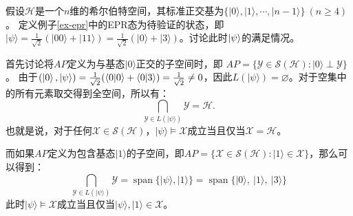 \begin{example}
    假设$\mathcal{H}$是一个$n$维的希尔伯特空间，其标准正交基为$\{|0\rangle, |1\rangle, \cdots, |n - 1\rangle\}\ (n \geq 4)$。
    定义例子\ref{ex-epr}中的EPR态为待验证的状态，即$|\psi\rangle = \frac{1}{\sqrt{2}}(|00\rangle + |11\rangle)= \frac{1}{\sqrt{2}}(|0\rangle + |3\rangle)$。讨论此时\(\ket{\psi}\)的满足情况。
    
    首先讨论将$AP$定义为与基态$|0\rangle$正交的子空间时，即
    $AP = \{\mathcal{Y} \in \mathcal{S}(\mathcal{H}) : |0\rangle \perp \mathcal{Y}\}$。
    由于$(\ket{0},\ket{\psi}) = \frac{1}{\sqrt{2}}(\langle 0|0\rangle + \langle 0|3\rangle) = \frac{1}{\sqrt{2}} \neq 0$，因此$L(|\psi\rangle) = \varnothing$。对于空集中的所有元素取交得到全空间，所以有：
    \begin{equation}
    {\bigcap_{\mathcal{Y} \in L(|\psi\rangle)} \mathcal{Y} = \mathcal{H}.}
    \end{equation}
    也就是说，对于任何$\mathcal{X} \in \mathcal{S}(\mathcal{H})$，$|\psi\rangle \models \mathcal{X}$成立当且仅当$\mathcal{X} = \mathcal{H}$。
    
    
    而如果$AP$定义为包含基态$|1\rangle$的子空间，即$AP = \{\mathcal{X} \in \mathcal{S}(\mathcal{H}) : |1\rangle \in \mathcal{X}\}$，那么可以得到：
    \begin{equation}
        {\bigcap_{\mathcal{Y} \in L(|\psi\rangle)} \mathcal{Y} = \operatorname{span}\{|\psi\rangle, |1\rangle}\} = \operatorname{span}\{|0\rangle,\ |1\rangle,\ |3\rangle\}
    \end{equation}
    此时$|\psi\rangle \models \mathcal{X}$成立当且仅当$|\psi\rangle,|1\rangle \in \mathcal{X}$。
\end{example}

